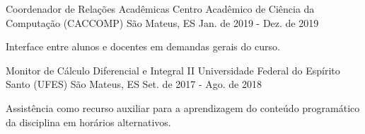 \begin{cventries}
  \cventry
    {Coordenador de Relações Acadêmicas} %
    {Centro Acadêmico de Ciência da Computação (CACCOMP)} %
    {São Mateus, ES} %
    {Jan. de 2019 - Dez. de 2019} %
    {
      \begin{cvitems} %
        \item {Interface entre alunos e docentes em demandas gerais do curso.}
      \end{cvitems}
    }


\cventry
{Monitor de Cálculo Diferencial e Integral II} %
{Universidade Federal do Espírito Santo (UFES)} %
{São Mateus, ES} %
{Set. de 2017 - Ago. de 2018} %
{
	      \begin{cvitems} %
	        \item {Assistência como recurso auxiliar para a aprendizagem do conteúdo programático da disciplina em horários alternativos.}
	      \end{cvitems}
}
%



\end{cventries}
